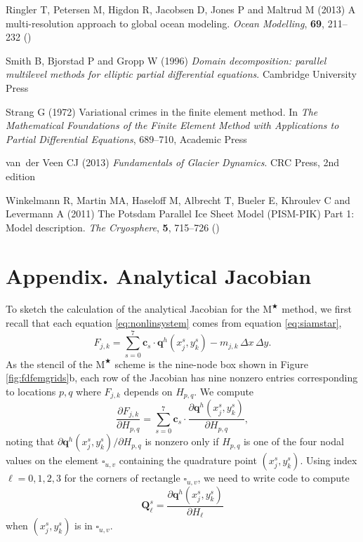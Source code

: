 \documentclass[review,letterpaper]{igs}
\newcommand\bc{\mathbf{c}}
\newcommand\bq{\mathbf{q}}
\newcommand\bQ{\mathbf{Q}}
\newcommand{\Mstar}{$\text{M}^{\bigstar}$\xspace}
\begin{document}
\begin{thebibliography}{42}
Ringler T, Petersen M, Higdon R, Jacobsen D, Jones P and Maltrud M (2013) A
  multi-resolution approach to global ocean modeling. \emph{Ocean Modelling},
  \textbf{69}, 211--232 ()

Smith B, Bjorstad P and Gropp W (1996) \emph{Domain decomposition: parallel
  multilevel methods for elliptic partial differential equations}. Cambridge
  University Press

Strang G (1972) Variational crimes in the finite element method. In \emph{The
  {M}athematical {F}oundations of the {F}inite {E}lement {M}ethod with
  {A}pplications to {P}artial {D}ifferential {E}quations}, 689--710, Academic
  Press

van~der Veen CJ (2013) \emph{Fundamentals of {G}lacier {D}ynamics}. CRC Press,
  2nd edition

Winkelmann R, Martin MA, Haseloff M, Albrecht T, Bueler E, Khroulev C and
  Levermann A (2011) The {P}otsdam {P}arallel {I}ce {S}heet {M}odel
  ({PISM-PIK}) {P}art 1: {M}odel description. \emph{The Cryosphere},
  \textbf{5}, 715--726 ()

\end{thebibliography}


\appendix
\section{Appendix. Analytical Jacobian}

To sketch the calculation of the analytical Jacobian for the \Mstar method, we first recall that each equation \eqref{eq:nonlinsystem} comes from equation \eqref{eq:siamstar},
\begin{equation}
  F_{j,k} = \sum_{s=0}^7 \bc_s\cdot \bq^h(x_j^s,y_k^s) - m_{j,k}\,\Delta x\,\Delta y.  \label{eq:res}
\end{equation}
As the stencil of the \Mstar scheme is the nine-node box shown in Figure \ref{fig:fdfemgrids}b, each row of the Jacobian has nine nonzero entries corresponding to locations $p,q$ where $F_{j,k}$ depends on $H_{p,q}$.  We compute
\begin{equation}
\frac{\partial F_{j,k}}{\partial H_{p,q}} = \sum_{s=0}^7 \bc_s\cdot \frac{\partial \bq^h(x_j^s,y_k^s)}{\partial H_{p,q}}, \label{eq:jacQsum}
\end{equation}
noting that $\partial \bq^h(x_j^s,y_k^s)/\partial H_{p,q}$ is nonzero only if $H_{p,q}$ is one of the four nodal values on the element $\square_{u,v}$ containing the quadrature point $(x_j^s,y_k^s)$.  Using index $\ell=0,1,2,3$ for the corners of rectangle $\square_{u,v}$, we need to write code to compute
\begin{equation}
\bQ_\ell^s = \frac{\partial \bq^h(x_j^s,y_k^s)}{\partial H_\ell} \label{eq:jacthegoal}
\end{equation}
when $(x_j^s,y_k^s)$ is in $\square_{u,v}$.
\end{document}
